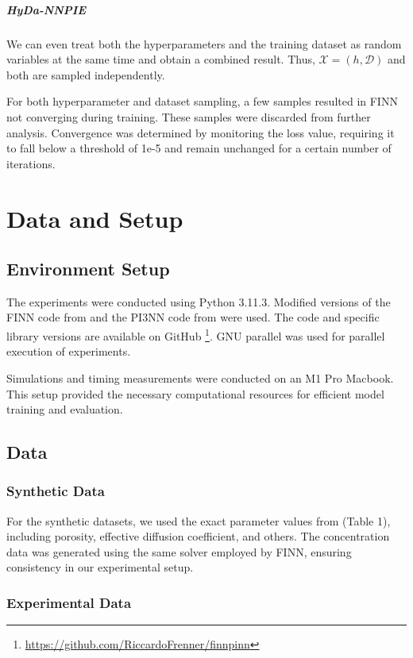 \paragraph{HyDa-NNPIE}

We can even treat both the hyperparameters and the training dataset as random variables at the same time and obtain a combined result. Thus, $\mathcal{X} = (h, \mathcal{D})$ and both are sampled independently.

For both hyperparameter and dataset sampling, a few samples resulted in FINN not converging during training. These samples were discarded from further analysis. Convergence was determined by monitoring the loss value, requiring it to fall below a threshold of 1e-5 and remain unchanged for a certain number of iterations.


\chapter{Data and Setup}
\label{sec:data_and_setup}
\section{Environment Setup}
The experiments were conducted using Python 3.11.3. Modified versions of the FINN code from \cite{finn} and the PI3NN code from \cite{pi3nn} were used. The code and specific library versions are available on GitHub \footnote{\url{https://github.com/RiccardoFrenner/finnpinn}}. GNU parallel \cite{tange_2023_10199085} was used for parallel execution of experiments.

Simulations and timing measurements were conducted on an M1 Pro Macbook. This setup provided the necessary computational resources for efficient model training and evaluation.


\section{Data}
\subsection{Synthetic Data}
\label{sec:synthetic_data}
For the synthetic datasets, we used the exact parameter values from \cite{finn} (Table 1), including porosity, effective diffusion coefficient, and others. The concentration data was generated using the same solver employed by FINN, ensuring consistency in our experimental setup.


\subsection{Experimental Data}
\label{sec:experimental_data}

